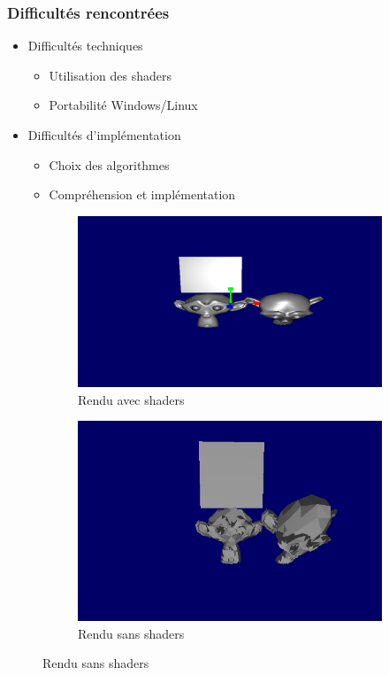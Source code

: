 \documentclass{beamer}
\begin{document}
\begin{frame}
\frametitle{Difficultés rencontrées}
\begin{itemize}[label=$\bullet$]
\item Difficultés techniques
\begin{itemize}[label=$\circ$]
\item Utilisation des shaders
\item Portabilité Windows/Linux
\end{itemize}
\item Difficultés d'implémentation
\begin{itemize}[label=$\circ$]
\item Choix des algorithmes
\item Compréhension et implémentation
\end{itemize}
\end{itemize}

\begin{figure}
\centering
\caption{Comparaison de rendu avec et sans shaders}
\begin{subfigure}{.4\textwidth}
	\centering
	\includegraphics[width=1\linewidth]{singe_shaders.png}
	\caption{Rendu avec shaders}
\end{subfigure}
\begin{subfigure}{.4\textwidth}
  \centering
  \includegraphics[width=1\linewidth]{rendu_sans_shader.png}
  \caption{Rendu sans shaders}
\end{subfigure}
\end{figure}


\end{frame}
\end{document}
